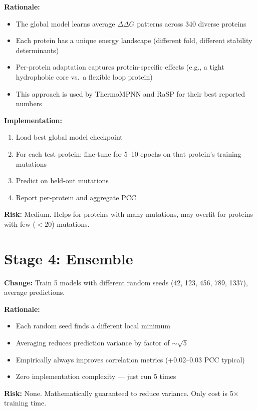 \textbf{Rationale:}
\begin{itemize}
    \item The global model learns average $\Delta\Delta G$ patterns across 340 diverse proteins
    \item Each protein has a unique energy landscape (different fold, different stability determinants)
    \item Per-protein adaptation captures protein-specific effects (e.g., a tight hydrophobic core vs.\ a flexible loop protein)
    \item This approach is used by ThermoMPNN and RaSP for their best reported numbers
\end{itemize}

\textbf{Implementation:}
\begin{enumerate}
    \item Load best global model checkpoint
    \item For each test protein: fine-tune for 5--10 epochs on that protein's training mutations
    \item Predict on held-out mutations
    \item Report per-protein and aggregate PCC
\end{enumerate}

\textbf{Risk:} Medium. Helps for proteins with many mutations, may overfit for proteins with few ($<$20) mutations.

\section{Stage 4: Ensemble}

\textbf{Change:} Train 5 models with different random seeds (42, 123, 456, 789, 1337), average predictions.

\textbf{Rationale:}
\begin{itemize}
    \item Each random seed finds a different local minimum
    \item Averaging reduces prediction variance by factor of $\sim\sqrt{5}$
    \item Empirically always improves correlation metrics (+0.02--0.03 PCC typical)
    \item Zero implementation complexity --- just run 5 times
\end{itemize}

\textbf{Risk:} None. Mathematically guaranteed to reduce variance. Only cost is 5$\times$ training time.

